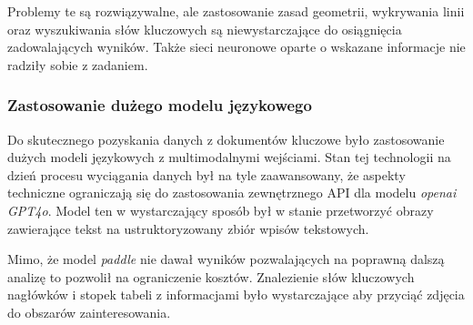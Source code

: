 Problemy te są rozwiązywalne, ale zastosowanie zasad geometrii,
wykrywania linii oraz wyszukiwania słów kluczowych są niewystarczające
do osiągnięcia zadowalających wyników. Także sieci neuronowe oparte
o wskazane informacje nie radziły sobie z zadaniem.



\subsubsection{Zastosowanie dużego modelu językowego}

Do skutecznego pozyskania danych z dokumentów kluczowe było zastosowanie
dużych modeli językowych z multimodalnymi wejściami. Stan tej technologii
na dzień procesu wyciągania danych był na tyle zaawansowany, że
aspekty techniczne ograniczają się do zastosowania zewnętrznego \ac{API}
dla modelu \textit{openai} \textit{GPT4o}. Model ten w wystarczający
sposób był w stanie przetworzyć obrazy zawierające tekst na ustruktoryzowany
zbiór wpisów tekstowych.

Mimo, że model \textit{paddle} nie dawał wyników pozwalających na
poprawną dalszą analizę to pozwolił na ograniczenie kosztów. Znalezienie
słów kluczowych nagłówków i stopek tabeli z informacjami było wystarczające
aby przyciąć zdjęcia do obszarów zainteresowania.

